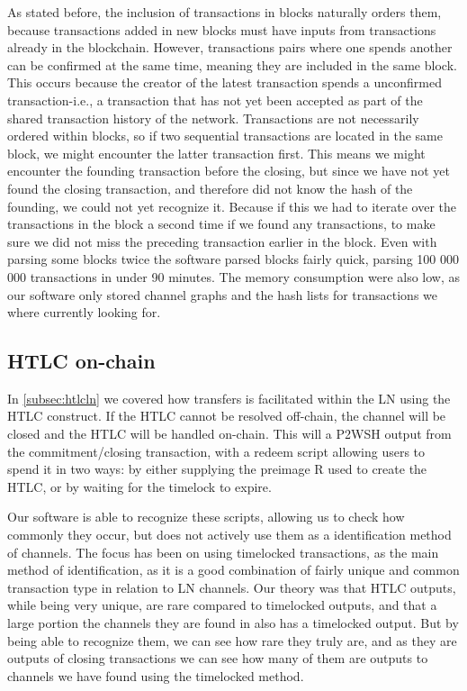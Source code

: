 As stated before, the inclusion of transactions in blocks naturally orders them, because transactions added in new blocks must have inputs from transactions already in the blockchain.
However, transactions pairs where one spends another can be confirmed at the same time, meaning they are included in the same block.
This occurs because the creator of the latest transaction spends a unconfirmed transaction-i.e., a transaction that has not yet been accepted as part of the shared transaction history of the network. 
Transactions are not necessarily ordered within blocks, so if two sequential transactions are located in the same block, we might encounter the latter transaction first.
This means we might encounter the founding transaction before the closing, but since we have not yet found the closing transaction, and therefore did not know the hash of the founding, we could not yet recognize it.
Because if this we had to iterate over the transactions in the block a second time if we found any transactions, to make sure we did not miss the preceding transaction earlier in the block.
Even with parsing some blocks twice the software parsed blocks fairly quick, parsing 100 000 000 transactions in under 90 minutes.
The memory consumption were also low, as our software only stored channel graphs and the hash lists for transactions we where currently looking for.

\subsection{HTLC on-chain}
\label{subsec:htlc_onchain}

In \cref{subsec:htlcln} we covered how transfers is facilitated within the LN using the HTLC construct. 
If the HTLC cannot be resolved off-chain, the channel will be closed and the HTLC will be handled on-chain.
This will a P2WSH output from the commitment/closing transaction, with a redeem script allowing users to spend it in two ways:
by either supplying the preimage R used to create the HTLC, or by waiting for the timelock to expire.



Our software is able to recognize these scripts, allowing us to check how commonly they occur, but does not actively use them as a identification method of channels.
The focus has been on using timelocked transactions, as the main method of identification, as it is a good combination of fairly unique and common transaction type in relation to LN channels. 
Our theory was that HTLC outputs, while being very unique, are rare compared to timelocked outputs, and that a large portion the channels they are found in also has a timelocked output.
But by being able to recognize them, we can see how rare they truly are, and as they are outputs of closing transactions we can see how many of them are outputs to channels we have found using the timelocked method.

